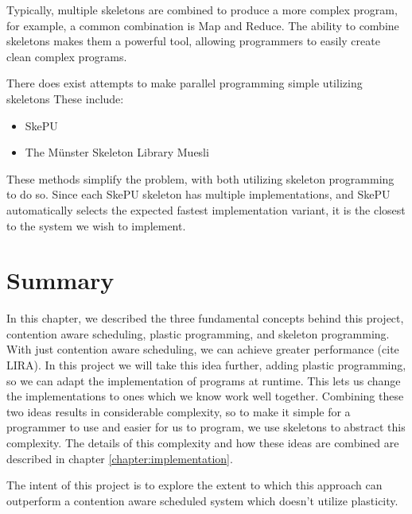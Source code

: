 Typically, multiple skeletons are combined to produce a more complex program, for example, a common combination is Map and Reduce. The ability to combine skeletons makes them a powerful tool, allowing programmers to easily create clean complex programs.


There does exist attempts to make parallel programming simple utilizing skeletons These include:

\begin{itemize}
	\item SkePU
	\item The Münster Skeleton Library Muesli
\end{itemize}

These methods simplify the problem, with both utilizing skeleton programming to do so. Since each SkePU skeleton has multiple implementations, and SkePU automatically selects the expected fastest implementation variant, it is the closest to the system we wish to implement.



\section{Summary}

In this chapter, we described the three fundamental concepts behind this project, contention aware scheduling, plastic programming, and skeleton programming. With just contention aware scheduling, we can achieve greater performance (cite LIRA). In this project we will take this idea further, adding plastic programming, so we can adapt the implementation of programs at runtime. This lets us change the implementations to ones which we know work well together. Combining these two ideas results in considerable complexity, so to make it simple for a programmer to use and easier for us to program, we use skeletons to abstract this complexity. The details of this complexity and how these ideas are combined are described in chapter \ref{chapter:implementation}.

The intent of this project is to explore the extent to which this approach can outperform a contention aware scheduled system which doesn't utilize plasticity.